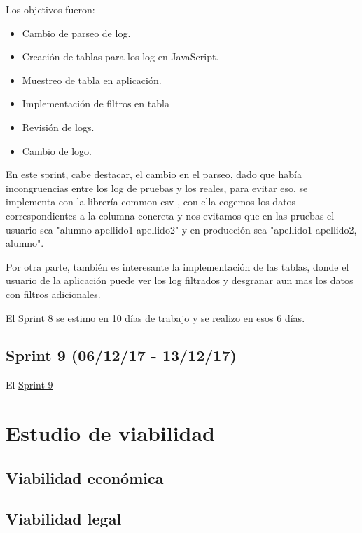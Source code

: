 Los objetivos fueron:
\begin{itemize}
	\tightlist
	\item
	Cambio de parseo de log.
	\item
	Creación de tablas para los log en JavaScript.
	\item
	Muestreo de tabla en aplicación.
	\item
	Implementación de filtros en tabla
	\item
	Revisión de logs.
	\item
	Cambio de logo.
	
\end{itemize}

En este sprint, cabe destacar, el cambio en el parseo, dado que había incongruencias entre los log de pruebas y los reales, para evitar eso, se implementa con la librería common-csv \cite{Java:csv}, con ella cogemos los datos correspondientes a la columna concreta y nos evitamos que en las pruebas el usuario sea "alumno apellido1 apellido2" y en producción sea "apellido1 apellido2, alumno".

Por otra parte, también es interesante la implementación de las tablas, donde el usuario de la aplicación puede ver los log filtrados y desgranar aun mas los datos con filtros adicionales.

El \href{https://github.com/trona85/GII-17.1B-UBULog-1.0/milestone/8?closed=1}{Sprint 8} se estimo en 10 días de trabajo y se realizo en esos 6 días.


\subsection{Sprint 9 (06/12/17 -
	13/12/17)}\label{sprint-8-061217---131217}

El \href{https://github.com/trona85/GII-17.1B-UBULog-1.0/milestone/9?closed=1}{Sprint 9}




\section{Estudio de viabilidad}

\subsection{Viabilidad económica}

\subsection{Viabilidad legal}


